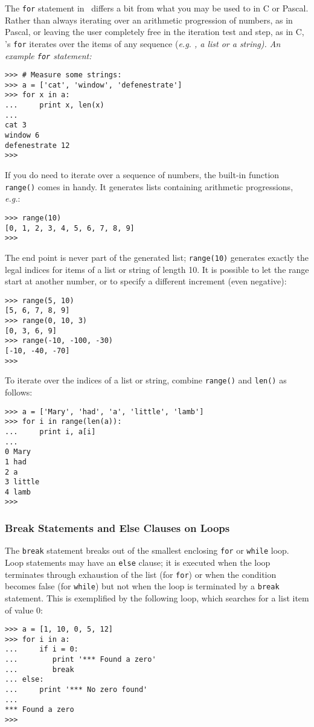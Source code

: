 The {\tt for} statement in \Python\ differs a bit from what you may be
used to in C or Pascal.
Rather than always iterating over an arithmetic progression of numbers,
as in Pascal, or leaving the user completely free in the iteration test
and step, as in C, \Python's {\tt for} iterates over the items of any
sequence (\it e.g.\rm%
, a list or a string).
An example {\tt for} statement:
\begin{code}\begin{verbatim}
>>> # Measure some strings:
>>> a = ['cat', 'window', 'defenestrate']
>>> for x in a:
...     print x, len(x)
... 
cat 3
window 6
defenestrate 12
>>> 
\end{verbatim}\end{code}
If you do need to iterate over a sequence of numbers, the built-in
function {\tt range()} comes in handy.
It generates lists containing arithmetic progressions,
{\it e.g.}:
\begin{code}\begin{verbatim}
>>> range(10)
[0, 1, 2, 3, 4, 5, 6, 7, 8, 9]
>>> 
\end{verbatim}\end{code}
The end point is never part of the generated list; {\tt range(10)}
generates exactly the legal indices for items of a list or string of
length 10.
It is possible to let the range start at another number, or to specify a
different increment (even negative):
\begin{code}\begin{verbatim}
>>> range(5, 10)
[5, 6, 7, 8, 9]
>>> range(0, 10, 3)
[0, 3, 6, 9]
>>> range(-10, -100, -30)
[-10, -40, -70]
>>> 
\end{verbatim}\end{code}
To iterate over the indices of a list or string, combine {\tt range()}
and {\tt len()} as follows:
\begin{code}\begin{verbatim}
>>> a = ['Mary', 'had', 'a', 'little', 'lamb']
>>> for i in range(len(a)):
...     print i, a[i]
... 
0 Mary
1 had
2 a
3 little
4 lamb
>>> 
\end{verbatim}\end{code}

\subsubsection{Break Statements and Else Clauses on Loops}

The {\tt break} statement breaks out of the smallest enclosing {\tt for}
or {\tt while} loop.
Loop statements may have an {\tt else} clause; it is executed when the
loop terminates through exhaustion of the list (for {\tt for}) or when
the condition becomes false (for {\tt while}) but not when the loop is
terminated by a {\tt break} statement.
This is exemplified by the following loop, which searches for a list
item of value 0:
\begin{code}\begin{verbatim}
>>> a = [1, 10, 0, 5, 12]
>>> for i in a:
...     if i = 0:
...        print '*** Found a zero'
...        break
... else:
...     print '*** No zero found'
... 
*** Found a zero
>>> 
\end{verbatim}\end{code}

